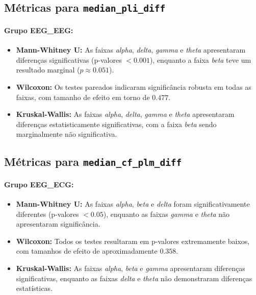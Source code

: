 \subsection{\texorpdfstring{Métricas para \texttt{median\_pli\_diff}}{Métricas para median\_pli\_diff}}

\paragraph{Grupo EEG\_EEG:}
\begin{itemize}
    \item \textbf{Mann-Whitney U:} As faixas \emph{alpha}, \emph{delta}, \emph{gamma} e \emph{theta} apresentaram diferenças significativas (p-valores $< 0.001$), enquanto a faixa \emph{beta} teve um resultado marginal ($p \approx 0.051$).
    \item \textbf{Wilcoxon:} Os testes pareados indicaram significância robusta em todas as faixas, com tamanho de efeito em torno de $0.477$.
    \item \textbf{Kruskal-Wallis:} As faixas \emph{alpha}, \emph{delta}, \emph{gamma} e \emph{theta} apresentaram diferenças estatisticamente significativas, com a faixa \emph{beta} sendo marginalmente não significativa.
\end{itemize}

\subsection{\texorpdfstring{Métricas para \texttt{median\_cf\_plm\_diff}}{Métricas para median\_cf\_plm\_diff}}

\paragraph{Grupo EEG\_ECG:}
\begin{itemize}
    \item \textbf{Mann-Whitney U:} As faixas \emph{alpha}, \emph{beta} e \emph{delta} foram significativamente diferentes (p-valores $< 0.05$), enquanto as faixas \emph{gamma} e \emph{theta} não apresentaram significância.
    \item \textbf{Wilcoxon:} Todos os testes resultaram em p-valores extremamente baixos, com tamanhos de efeito de aproximadamente $0.358$.
    \item \textbf{Kruskal-Wallis:} As faixas \emph{alpha}, \emph{beta} e \emph{gamma} apresentaram diferenças significativas, enquanto as faixas \emph{delta} e \emph{theta} não demonstraram diferenças estatísticas.
\end{itemize}

